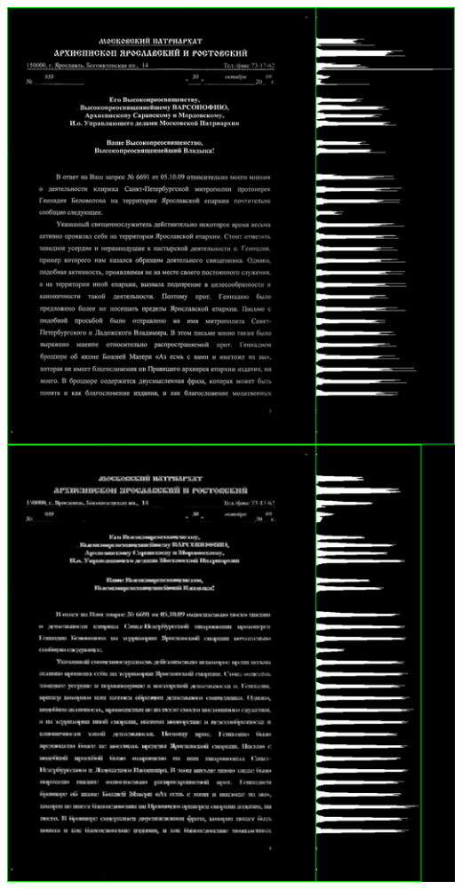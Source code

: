 \documentclass[11pt]{article}
\begin{document}
    \includegraphics[scale=0.7]{output-gradient.png}
\end{document}
